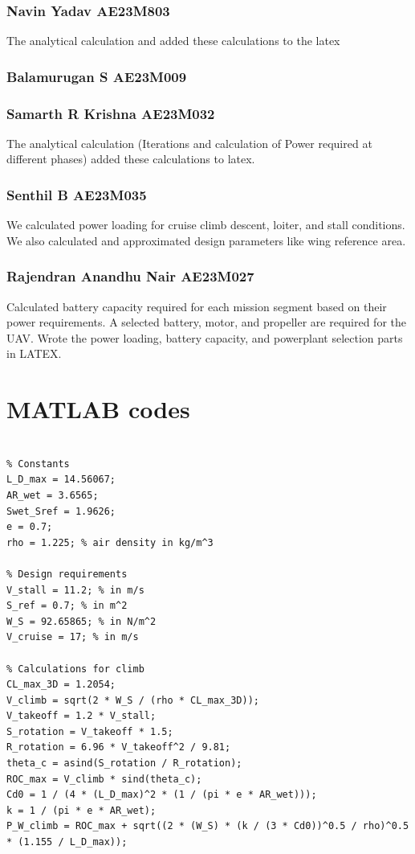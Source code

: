 \documentclass[12 pt]{article}
\begin{document}
{\subsubsection{Navin Yadav AE23M803}
The analytical calculation and added these calculations to the latex 

\subsubsection{Balamurugan S AE23M009}


\subsubsection{Samarth R Krishna AE23M032}
The analytical calculation (Iterations and calculation of Power required at different phases) added these calculations to latex.


\subsubsection{Senthil B AE23M035}
We calculated power loading for cruise climb descent, loiter, and stall conditions. We also calculated and approximated design parameters like wing reference area.

\subsubsection{Rajendran Anandhu Nair AE23M027}
Calculated battery capacity required for each mission segment based on their power requirements. A selected battery, motor, and propeller are required for the UAV. Wrote the power loading, battery capacity, and powerplant selection parts in LATEX. 


\newpage

\section{MATLAB codes}

\begin{lstlisting}[style=mystyle, caption={MATLAB code for Power Calculations}, label={lst:matlab_code}]

% Constants
L_D_max = 14.56067;
AR_wet = 3.6565;
Swet_Sref = 1.9626;
e = 0.7;
rho = 1.225; % air density in kg/m^3

% Design requirements
V_stall = 11.2; % in m/s
S_ref = 0.7; % in m^2
W_S = 92.65865; % in N/m^2
V_cruise = 17; % in m/s

% Calculations for climb
CL_max_3D = 1.2054;
V_climb = sqrt(2 * W_S / (rho * CL_max_3D));
V_takeoff = 1.2 * V_stall;
S_rotation = V_takeoff * 1.5;
R_rotation = 6.96 * V_takeoff^2 / 9.81;
theta_c = asind(S_rotation / R_rotation);
ROC_max = V_climb * sind(theta_c);
Cd0 = 1 / (4 * (L_D_max)^2 * (1 / (pi * e * AR_wet)));
k = 1 / (pi * e * AR_wet);
P_W_climb = ROC_max + sqrt((2 * (W_S) * (k / (3 * Cd0))^0.5 / rho)^0.5 * (1.155 / L_D_max));


\end{lstlisting}}
\end{document}
